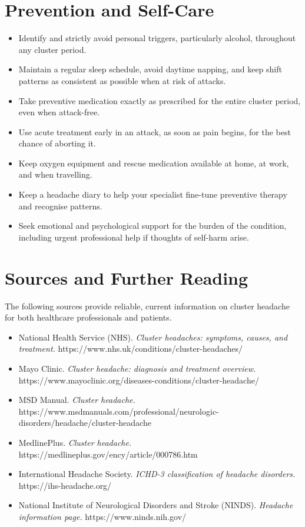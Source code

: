 \section*{Prevention and Self-Care}
\begin{itemize}
    \item Identify and strictly avoid personal triggers, particularly alcohol, throughout any cluster period.
    \item Maintain a regular sleep schedule, avoid daytime napping, and keep shift patterns as consistent as possible when at risk of attacks.
    \item Take preventive medication exactly as prescribed for the entire cluster period, even when attack-free.
    \item Use acute treatment early in an attack, as soon as pain begins, for the best chance of aborting it.
    \item Keep oxygen equipment and rescue medication available at home, at work, and when travelling.
    \item Keep a headache diary to help your specialist fine-tune preventive therapy and recognise patterns.
    \item Seek emotional and psychological support for the burden of the condition, including urgent professional help if thoughts of self-harm arise.
\end{itemize}

\section*{Sources and Further Reading}
The following sources provide reliable, current information on cluster headache for both healthcare professionals and patients.
\begin{itemize}
    \item National Health Service (NHS). \textit{Cluster headaches: symptoms, causes, and treatment.} https://www.nhs.uk/conditions/cluster-headaches/
    \item Mayo Clinic. \textit{Cluster headache: diagnosis and treatment overview.} https://www.mayoclinic.org/diseases-conditions/cluster-headache/
    \item MSD Manual. \textit{Cluster headache.} https://www.msdmanuals.com/professional/neurologic-disorders/headache/cluster-headache
    \item MedlinePlus. \textit{Cluster headache.} https://medlineplus.gov/ency/article/000786.htm
    \item International Headache Society. \textit{ICHD-3 classification of headache disorders.} https://ihs-headache.org/
    \item National Institute of Neurological Disorders and Stroke (NINDS). \textit{Headache information page.} https://www.ninds.nih.gov/
\end{itemize}
